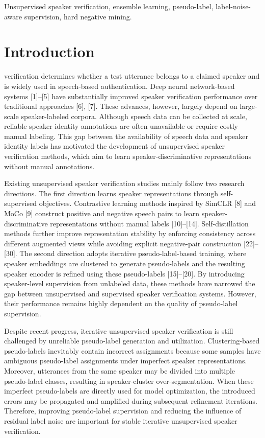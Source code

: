 \documentclass[journal]{IEEEtran}
\begin{document}
\begin{IEEEkeywords}
Unsupervised speaker verification, ensemble learning, pseudo-label, label-noise-aware supervision, hard negative mining.
\end{IEEEkeywords}

\section{Introduction}

 verification determines whether a test
utterance belongs to a claimed speaker and is widely used in
speech-based authentication. Deep neural network-based systems
[1]--[5] have substantially improved speaker verification performance
over traditional approaches [6], [7]. These advances, however, largely
depend on large-scale speaker-labeled corpora. Although speech data can
be collected at scale, reliable speaker identity annotations are often
unavailable or require costly manual labeling. This gap between the
availability of speech data and speaker identity labels has motivated
the development of unsupervised speaker verification methods, which aim
to learn speaker-discriminative representations without manual
annotations.

Existing unsupervised speaker verification studies mainly follow two
research directions. The first direction learns speaker representations
through self-supervised objectives. Contrastive learning methods
inspired by SimCLR [8] and MoCo [9] construct positive and negative
speech pairs to learn speaker-discriminative representations without
manual labels [10]--[14]. Self-distillation methods further improve
representation stability by enforcing consistency across different
augmented views while avoiding explicit negative-pair construction
[22]--[30]. The second direction adopts iterative pseudo-label-based
training, where speaker embeddings are clustered to generate
pseudo-labels and the resulting speaker encoder is refined using these
pseudo-labels [15]--[20]. By introducing speaker-level supervision from
unlabeled data, these methods have narrowed the gap between unsupervised
and supervised speaker verification systems. However, their performance
remains highly dependent on the quality of pseudo-label supervision.

Despite recent progress, iterative unsupervised speaker verification is
still challenged by unreliable pseudo-label generation and utilization.
Clustering-based pseudo-labels inevitably contain incorrect assignments
because some samples have ambiguous pseudo-label assignments under imperfect speaker representations.
Moreover, utterances from the same speaker may be divided into multiple
pseudo-label classes, resulting in speaker-cluster over-segmentation.
When these imperfect pseudo-labels are directly used for model
optimization, the introduced errors may be propagated and amplified
during subsequent refinement iterations. Therefore, improving pseudo-label
supervision and reducing the influence of residual label noise are important
for stable iterative unsupervised speaker verification.
\end{document}
